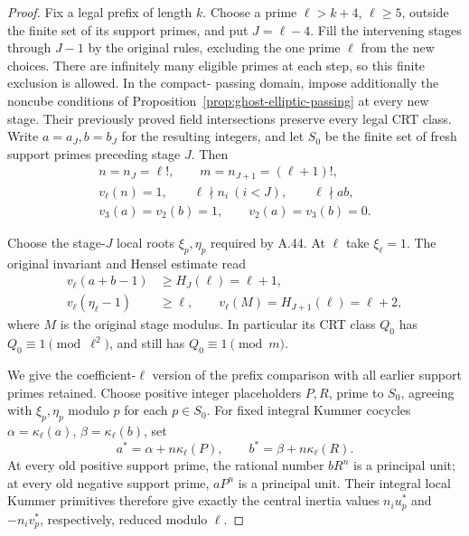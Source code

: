 \begin{proof}
Fix a legal prefix of length \(k\). Choose a prime
\(\ell>k+4\), \(\ell\ge5\), outside the finite
set of its support primes, and put
\(J=\ell-4\). Fill the intervening stages through
\(J-1\) by the original rules, excluding the one
prime \(\ell\) from the new choices. There are
infinitely many eligible primes at each step, so
this finite exclusion is allowed. In the compact-
passing domain, impose additionally the noncube
conditions of
Proposition~\ref{prop:ghost-elliptic-passing} at
every new stage. Their previously proved field
intersections preserve every legal CRT class.
Write \(a=a_J,b=b_J\) for the resulting integers,
and let \(S_0\) be the finite set of fresh support
primes preceding stage \(J\).
Then
\[
 \begin{gathered}
 n=n_J=\ell!,\qquad m=n_{J+1}=(\ell+1)!,\\
 v_\ell(n)=1,\qquad \ell\nmid n_i\ (i<J),\qquad
 \ell\nmid ab,\\
 v_3(a)=v_2(b)=1,\qquad v_2(a)=v_3(b)=0.
 \end{gathered}                                      \tag{65}
\]

Choose the stage-\(J\) local roots \(\xi_p,\eta_p\)
required by A.44. At \(\ell\) take
\(\xi_\ell=1\). The original invariant and
Hensel estimate read
\[
 \begin{split}
 v_\ell(a+b-1)&\ge H_J(\ell)=\ell+1,\\
 v_\ell(\eta_\ell-1)&\ge\ell,\qquad
       v_\ell(M)=H_{J+1}(\ell)=\ell+2,
 \end{split}                                         \tag{66}
\]
where \(M\) is the original stage modulus.
In particular its CRT class \(Q_0\) has
\(Q_0\equiv1\pmod{\ell^2}\), and still has
\(Q_0\equiv1\pmod m\).

We give the coefficient-\(\ell\) version of the
prefix comparison with all earlier support primes
retained. Choose positive integer placeholders
\(P,R\), prime to \(S_0\), agreeing with
\(\xi_p,\eta_p\) modulo \(p\) for each
\(p\in S_0\). For fixed integral Kummer cocycles
\(\alpha=\kappa_\ell(a)\),
\(\beta=\kappa_\ell(b)\), set
\[
 a^*=\alpha+n\kappa_\ell(P),\qquad
 b^*=\beta+n\kappa_\ell(R).                            \tag{67}
\]
At every old positive support prime, the rational
number \(bR^n\) is a principal unit; at every old
negative support prime, \(aP^n\) is a principal
unit. Their integral local Kummer primitives
therefore give exactly the central inertia values
\(n_i u_p^*\) and \(-n_i v_p^*\), respectively,
reduced modulo \(\ell\).


\end{proof}

